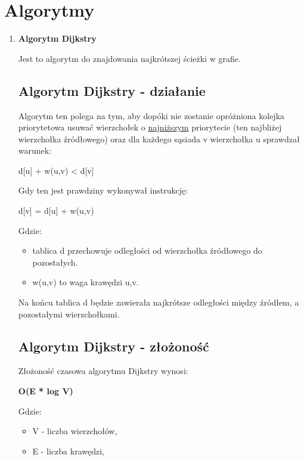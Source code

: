 \documentclass{article}
\begin{document}
\section{Algorytmy}
{\fontsize{13}{13}\selectfont
    \begin{enumerate}
        \item\textbf{Algorytm Dijkstry}
        
            Jest to algorytm do znajdowania najkrótszej ścieżki w grafie.
            
            \subsection{Algorytm Dijkstry - działanie}
            Algorytm ten polega na tym, aby dopóki nie zostanie opróżniona kolejka priorytetowa usuwać wierzchołek o \underline{najniższym} priorytecie (ten najbliżej wierzchołka źródłowego) oraz dla każdego sąsiada v wierzchołka u sprawdzał warunek:
            
            d[u] + w(u,v) < d[v]
            
            \setlength{\parindent}{0pt}
            Gdy ten jest prawdziny wykonywał instrukcję:
            
            d[v] = d[u] + w(u,v)
        
            
            Gdzie:
            \begin{itemize}
                \item tablica d przechowuje odległości od wierzchołka źródłowego do pozostałych.
                \item w(u,v) to waga krawędzi u,v.
            \end{itemize}

            \setlength{\parindent}{12pt}
            
            Na końcu tablica d będzie zawierała najkrótsze odległości między źródłem, a pozostałymi wierzchołkami.


            \subsection{Algorytm Dijkstry - złożoność}
            Złożoność czasowa algorytmu Dijkstry wynosi:
            
            \textbf{O(E * log V)}
            
            Gdzie:
            \begin{itemize}
                \item V - liczba wierzchołów,
                \item E - liczba krawędzi,
            \end{itemize}
            

\end{enumerate}}
\end{document}
